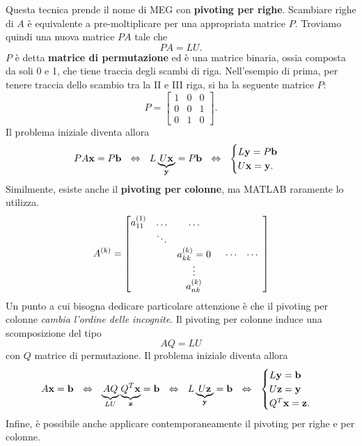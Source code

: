 Questa tecnica prende il nome di MEG con \textbf{pivoting per righe}.
Scambiare righe di $A$ è equivalente a pre-moltiplicare per una appropriata matrice $P$.
Troviamo quindi una nuova matrice $PA$ tale che
\begin{equation*}
PA=LU.
\end{equation*}
$\displaystyle P$ è detta \textbf{matrice di permutazione} ed è una matrice binaria, ossia composta da soli 0 e 1, che tiene traccia degli scambi di riga.
Nell'esempio di prima, per tenere traccia dello scambio tra la II e III riga, si ha la seguente matrice $P$:
\begin{equation*}
P=\begin{bmatrix}
1 & 0 & 0\\
0 & 0 & 1\\
0 & 1 & 0
\end{bmatrix}.
\end{equation*}
Il problema iniziale diventa allora
\begin{equation*}
PA\x =P\mathbf{b} \ \ \Leftrightarrow \ \ L\underbrace{U\x}_{\y} =P\mathbf{b} \ \ \Leftrightarrow \ \ \begin{cases}
L\y =P\mathbf{b}\\
U\x =\y.
\end{cases}
\end{equation*}
Similmente, esiste anche il \textbf{pivoting per colonne}, ma MATLAB raramente lo utilizza.
\begin{equation*}
A^{(k)} =\begin{bmatrix}
a^{(1)}_{11} & \dotsc  & \dotsc  & \\
 & \ddots  &  & \\
 &  & a^{(k)}_{kk} =0 & \begin{array}{c c}
\cdots  & \cdots \\
\end{array}\\
 &  & \vdots  & \\
 &  & a^{(k)}_{nk} &
\end{bmatrix}
\end{equation*}
Un punto a cui bisogna dedicare particolare attenzione è che il pivoting per colonne \textit{cambia l'ordine delle incognite}. Il pivoting per colonne induce una scomposizione del tipo
\begin{equation*}
AQ=LU
\end{equation*}
con $\displaystyle Q$ matrice di permutazione. Il problema iniziale diventa allora
\begin{equation*}
A\x =\mathbf{b} \ \ \Leftrightarrow \ \ \underbrace{AQ}_{LU}\underbrace{Q^{T}\x}_{\mathbf{z}} =\mathbf{b} \ \ \Leftrightarrow \ \ L\underbrace{U\mathbf{z}}_{\y} =\mathbf{b} \ \ \Leftrightarrow \ \ \begin{cases}
L\y =\mathbf{b}\\
U\mathbf{z} =\y\\
Q^{T}\x =\mathbf{z}.
\end{cases}
\end{equation*}
Infine, è possibile anche applicare contemporaneamente il pivoting per righe e per colonne.

